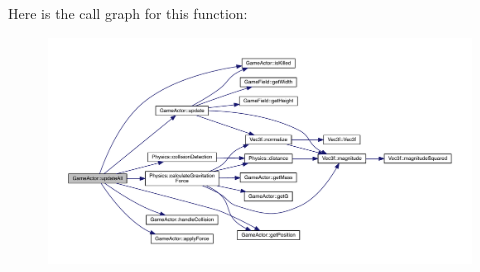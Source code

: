 Here is the call graph for this function\+:\nopagebreak
\begin{figure}[H]
\begin{center}
\leavevmode
\includegraphics[width=350pt]{class_game_actor_a2d3b93df5edf86dea7d65ab7dac0e3f7_cgraph}
\end{center}
\end{figure}




